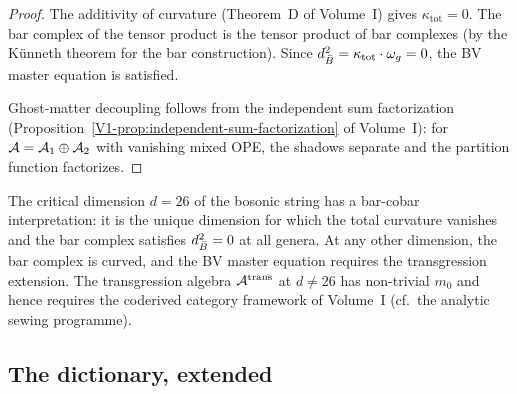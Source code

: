 \begin{proof}
The additivity of curvature (Theorem~D of Volume~I) gives
$\kappa_{\mathrm{tot}} = 0$. The bar complex of the tensor product is
the tensor product of bar complexes (by the K\"unneth theorem for the
bar construction). Since $d_{\bar{B}}^2 = \kappa_{\mathrm{tot}} \cdot
\omega_g = 0$, the BV master equation is satisfied.

Ghost-matter decoupling follows from the independent sum factorization
(Proposition~\ref*{V1-prop:independent-sum-factorization} of Volume~I):
for $\mathcal{A} = \mathcal{A}_1 \oplus \mathcal{A}_2$ with vanishing mixed OPE, the shadows
separate and the partition function factorizes.
\end{proof}

\begin{remark}[Central charge $c = 26$ from bar-cobar]
The critical dimension $d = 26$ of the bosonic string has a bar-cobar
interpretation: it is the unique dimension for which the total curvature
vanishes and the bar complex satisfies $d_{\bar{B}}^2 = 0$ at all genera.
At any other dimension, the bar complex is curved, and the BV master
equation requires the transgression extension. The transgression
algebra $\mathcal{A}^{\mathrm{trans}}$ at $d \neq 26$ has non-trivial $m_0$
and hence requires the coderived category framework of Volume~I
(cf.\ the analytic sewing programme).
\end{remark}

\subsection{The dictionary, extended}

